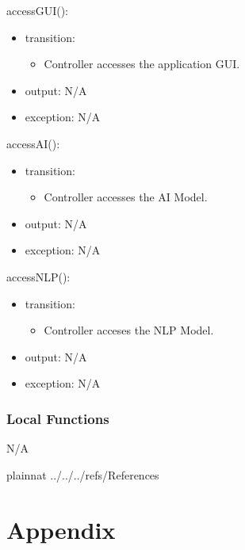 \documentclass[12pt, titlepage]{article}
\begin{document}
\noindent accessGUI():
\begin{itemize}
\item transition: \begin{itemize}
    \item Controller accesses the application GUI.
\end{itemize} 
\item output: N/A 
\item exception: N/A
\end{itemize}

\noindent accessAI():
\begin{itemize}
\item transition: \begin{itemize}
    \item Controller accesses the AI Model.
\end{itemize}
\item output: N/A
\item exception: N/A
\end{itemize}

\noindent accessNLP():
\begin{itemize}
\item transition: \begin{itemize}
    \item Controller acceses the NLP Model.
\end{itemize}
\item output: N/A 
\item exception: N/A
\end{itemize}

\subsubsection{Local Functions}
N/A

\newpage

 {plainnat}
 {../../../refs/References}

\newpage

\section{Appendix} \label{Appendix}
\end{document}
